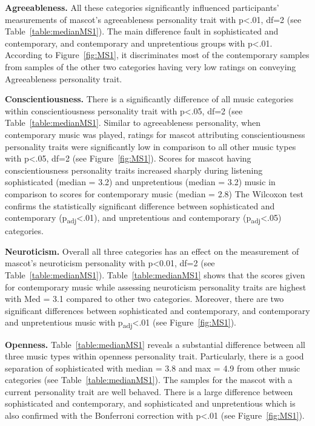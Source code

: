 \par\textbf{Agreeableness.}
All these categories significantly influenced participants' measurements of mascot's
agreeableness personality trait with p<.01, df=2 (see Table~\ref{table:medianMS1}).
The main difference fault in sophisticated and contemporary, and contemporary
and unpretentious groups with p<.01.
According to Figure~\ref{fig:MS1}, it discriminates most of the contemporary samples from
samples of the other two categories having very low ratings on conveying Agreeableness personality trait.

\par\textbf{Conscientiousness.}
There is a significantly difference of all music categories within conscientiousness
personality trait with p<.05, df=2 (see Table~\ref{table:medianMS1}.
Similar to agreeableness personality, when contemporary music was played, ratings
for mascot attributing conscientiousness personality traits were significantly low
in comparison to all other music types with p<.05, df=2 (see Figure~\ref{fig:MS1}).
Scores for mascot having conscientiousness personality traits increased sharply during listening sophisticated
(median = 3.2) and unpretentious (median = 3.2) music in comparison to scores for contemporary music (median = 2.8)
The Wilcoxon test confirms the statistically significant difference between sophisticated and contemporary
(p\textsubscript{adj}<.01), and unpretentious and contemporary (p\textsubscript{adj}<.05) categories.

\par\textbf{Neuroticism.}
Overall all three categories has an effect on the measurement of mascot's neuroticism
personality with p<0.01, df=2 (see Table~\ref{table:medianMS1}).
Table~\ref{table:medianMS1} shows that the scores given for contemporary music while assessing
neuroticism personality traits are highest with Med = 3.1 compared to other two categories.
Moreover, there are two significant differences between sophisticated and contemporary,
and contemporary and unpretentious music with p\textsubscript{adj}<.01 (see Figure~\ref{fig:MS1}).

\par\textbf{Openness.}
Table~\ref{table:medianMS1} reveals a substantial difference between all three music types
within openness personality trait.
Particularly, there is a good separation of sophisticated with median = 3.8 and max = 4.9
from other music categories (see Table~\ref{table:medianMS1}).
The samples for the mascot with a current personality trait are well behaved.
There is a large difference between sophisticated and contemporary, and sophisticated
and unpretentious which is also confirmed with the Bonferroni correction with p<.01 (see Figure~\ref{fig:MS1}).


